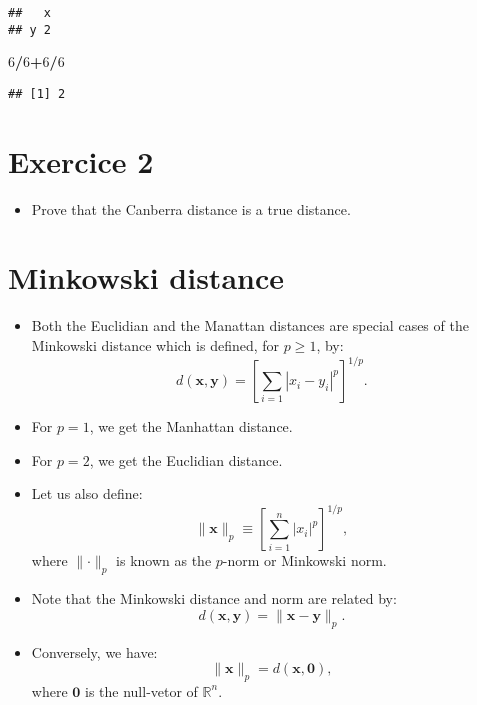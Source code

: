 \documentclass[
]{article}
\newenvironment{Shaded}{\begin{snugshade}}{\end{snugshade}}
\newcommand{\DecValTok}[1]{\textcolor[rgb]{0.00,0.00,0.81}{#1}}
\newcommand{\OperatorTok}[1]{\textcolor[rgb]{0.81,0.36,0.00}{\textbf{#1}}}
\providecommand{\tightlist}{%
  \setlength{\itemsep}{0pt}\setlength{\parskip}{0pt}}
\begin{document}
\begin{verbatim}
##   x
## y 2
\end{verbatim}

\begin{Shaded}
\begin{Highlighting}[]
\DecValTok{6}\OperatorTok{/}\DecValTok{6}\OperatorTok{+}\DecValTok{6}\OperatorTok{/}\DecValTok{6}
\end{Highlighting}
\end{Shaded}

\begin{verbatim}
## [1] 2
\end{verbatim}

\hypertarget{exercice-2}{%
\section{Exercice 2}\label{exercice-2}}

\begin{itemize}
\tightlist
\item
  Prove that the Canberra distance is a true distance.
\end{itemize}

\hypertarget{minkowski-distance}{%
\section{Minkowski distance}\label{minkowski-distance}}

\begin{itemize}
\tightlist
\item
  Both the Euclidian and the Manattan distances are special cases of the
  Minkowski distance which is defined, for \(p\geq 1\), by: \[
  d(\mathbf{x},\mathbf{y})=
  \left[\sum_{i=1} |x_i-y_i|^{p}\right]^{1/p}.
  \]
\item
  For \(p=1\), we get the Manhattan distance.
\item
  For \(p=2\), we get the Euclidian distance.
\item
  Let us also define:
  \[\|\mathbf{x}\|_p\equiv\left[\sum_{i=1}^n |x_i|^{p}\right]^{1/p},\]
  where \(\|\mathbf{\cdot}\|_p\) is known as the \(p\)-norm or Minkowski
  norm.
\item
  Note that the Minkowski distance and norm are related by: \[
  d(\mathbf{x},\mathbf{y})=\|\mathbf{x}-\mathbf{y}\|_p.
  \]
\item
  Conversely, we have: \[
  \|\mathbf{x}\|_p=d(\mathbf{x},\mathbf{0}),
  \] where \(\mathbf{0}\) is the null-vetor of \(\mathbb{R}^n\).
\end{itemize}
\end{document}
